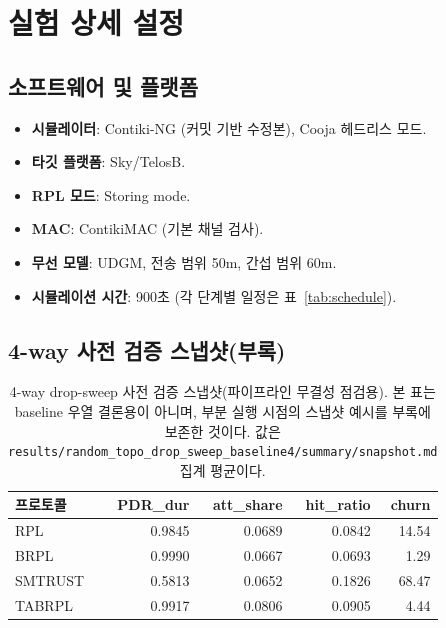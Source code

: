 \documentclass[12pt,a4paper]{article}
\begin{document}
\appendix
\section{실험 상세 설정}
\label{app:setup}

\subsection{소프트웨어 및 플랫폼}

\begin{itemize}
  \item \textbf{시뮬레이터}: Contiki-NG (커밋 기반 수정본),
    Cooja 헤드리스 모드.
  \item \textbf{타깃 플랫폼}: Sky/TelosB.
  \item \textbf{RPL 모드}: Storing mode.
  \item \textbf{MAC}: ContikiMAC (기본 채널 검사).
  \item \textbf{무선 모델}: UDGM, 전송 범위 50m, 간섭 범위 60m.
  \item \textbf{시뮬레이션 시간}: 900초 (각 단계별 일정은 표~\ref{tab:schedule}).
\end{itemize}

\subsection{4-way 사전 검증 스냅샷(부록)}

\begin{table}[htbp]
\centering
\caption{4-way drop-sweep 사전 검증 스냅샷(파이프라인 무결성 점검용).
  본 표는 baseline 우열 결론용이 아니며, 부분 실행 시점의
  스냅샷 예시를 부록에 보존한 것이다.
  값은 \texttt{results/random\_topo\_drop\_sweep\_baseline4/summary/snapshot.md}
  집계 평균이다.}
\label{tab:precheck4way_appendix}
\begin{tabular}{lrrrr}
\toprule
프로토콜 & PDR\_dur & att\_share & hit\_ratio & churn \\
\midrule
RPL     & 0.9845 & 0.0689 & 0.0842 & 14.54 \\
BRPL    & 0.9990 & 0.0667 & 0.0693 & 1.29 \\
SMTRUST & 0.5813 & 0.0652 & 0.1826 & 68.47 \\
TABRPL  & 0.9917 & 0.0806 & 0.0905 & 4.44 \\
\bottomrule
\end{tabular}
\end{table}
\end{document}
